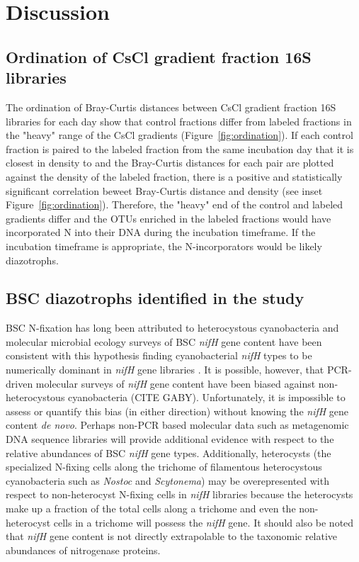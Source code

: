\section{Discussion}

\subsection{Ordination of CsCl gradient fraction 16S libraries}
The ordination of Bray-Curtis distances between CsCl gradient fraction 16S
libraries for each day show that control fractions differ from labeled
fractions in the "heavy" range of the CsCl gradients
(Figure~\ref{fig:ordination}). If each control fraction is paired to the
labeled fraction from the same incubation day that it is closest in density to
and the Bray-Curtis distances for each pair are plotted against the density of
the labeled fraction, there is a positive and statistically significant
correlation beweet Bray-Curtis distance and density (see inset
Figure~\ref{fig:ordination}).  Therefore, the "heavy" end of the control and
labeled gradients differ and the
OTUs enriched in the labeled fractions would have incorporated N into their DNA
during the incubation timeframe. If the incubation timeframe is appropriate,
the N-incorporators would be likely diazotrophs.     

\subsection{BSC diazotrophs identified in the study}
BSC N-fixation has long been attributed to heterocystous cyanobacteria and
molecular microbial ecology surveys of BSC \textit{nifH} gene content have been
consistent with this hypothesis finding cyanobacterial \textit{nifH} types to
be numerically dominant in \textit{nifH} gene libraries
\citep{Yeager,14766579,Yeager_2012}. It is possible, however, that PCR-driven
molecular surveys of \textit{nifH} gene content have been biased against
non-heterocystous cyanobacteria (CITE GABY). Unfortunately, it is impossible to
assess or quantify this bias (in either direction) without knowing the
\textit{nifH} gene content \textit{de novo}. Perhaps non-PCR based molecular
data such as metagenomic DNA sequence libraries will provide additional
evidence with respect to the relative abundances of BSC \textit{nifH} gene
types. Additionally, heterocysts (the specialized N-fixing cells along the
trichome of filamentous heterocystous cyanobacteria such as \textit{Nostoc} and
\textit{Scytonema}) may be overepresented with respect to non-heterocyst
N-fixing cells in \textit{nifH} libraries because the heterocysts make up a
fraction of the total cells along a trichome and even the non-heterocyst cells
in a trichome will possess the \textit{nifH} gene. It should also be noted that
\textit{nifH} gene content is not directly extrapolable to the taxonomic
relative abundances of nitrogenase proteins.

